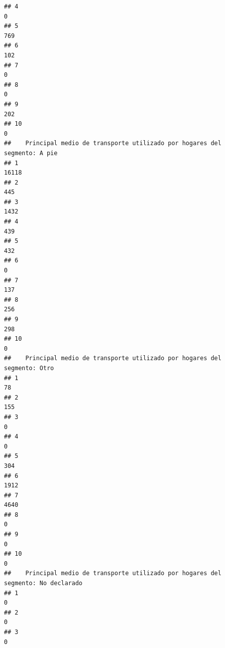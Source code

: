 \documentclass[11pt,]{article}
\begin{document}
\begin{verbatim}
## 4                                                                                     0
## 5                                                                                   769
## 6                                                                                   102
## 7                                                                                     0
## 8                                                                                     0
## 9                                                                                   202
## 10                                                                                    0
##    Principal medio de transporte utilizado por hogares del segmento: A pie
## 1                                                                    16118
## 2                                                                      445
## 3                                                                     1432
## 4                                                                      439
## 5                                                                      432
## 6                                                                        0
## 7                                                                      137
## 8                                                                      256
## 9                                                                      298
## 10                                                                       0
##    Principal medio de transporte utilizado por hogares del segmento: Otro
## 1                                                                      78
## 2                                                                     155
## 3                                                                       0
## 4                                                                       0
## 5                                                                     304
## 6                                                                    1912
## 7                                                                    4640
## 8                                                                       0
## 9                                                                       0
## 10                                                                      0
##    Principal medio de transporte utilizado por hogares del segmento: No declarado
## 1                                                                               0
## 2                                                                               0
## 3                                                                               0

\end{verbatim}
\end{document}
